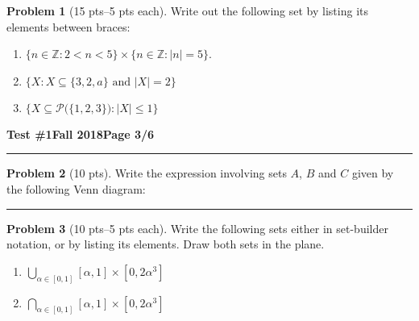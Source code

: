 \documentclass[11pt]{article}
\theoremstyle{definition}
\newtheorem{problem}{Problem}
\begin{document}
\begin{problem}[15 pts--5 pts each]
  Write out the following set by listing its elements between braces:
  \begin{enumerate}
  \item $\{ n \in \mathbb{Z} : 2 < n < 5 \} \times \{ n \in \mathbb{Z} : \lvert n \rvert = 5 \}$.
    \vspace{2cm}
  \item $\big\{ X : X \subseteq \{ 3, 2, a \} \text{ and } \lvert X \rvert = 2 \big\}$
    \vspace{2cm}
  \item $\big\{ X \subseteq \mathscr{P}\big( \{ 1,2,3 \} \big) : \lvert X \rvert \leq 1 \big\}$
    \vspace{7cm}
  \end{enumerate}
\end{problem}
\newpage

\hfill{\large\bf Test \#1}\hfill{\large\bf Fall 2018}\hfill{\large\bf Page 3/6}\hrule

\bigskip
\begin{problem}[10 pts]
  Write the expression involving sets $A$, $B$ and $C$ given by the following Venn diagram:
  \begin{center}
  \end{center}

  \vspace{1cm}
\end{problem}
\hrule

\begin{problem}[10 pts--5 pts each]
  Write the following sets either in set-builder notation, or by listing its elements.  Draw both sets in the plane.
  \begin{enumerate}
  \item $\displaystyle{\bigcup_{\alpha \in [0,1]}[\alpha,1] \times [0,2\alpha^3]}$
  \item $\displaystyle{\bigcap_{\alpha \in [0,1]}[\alpha,1] \times [0,2\alpha^3]}$
  \end{enumerate}

  \vspace{8cm}
\end{problem}
\end{document}
